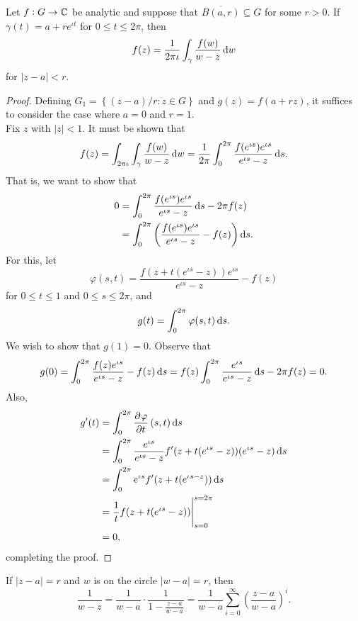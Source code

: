 	\begin{prop}
		Let $f : G \to \mathbb{C}$ be analytic and suppose that $\overline{B(a,r)} \subseteq G$ for some $r > 0$. If $\gamma(t) = a + re^{\iota t}$ for $ 0 \le t \le 2\pi$, then
		\[ f(z) = \frac{1}{2\pi\iota} \int_\gamma \frac{f(w)}{w - z} \dif w \]
		for $|z-a| < r$.
	\end{prop}
	\begin{proof}
		Defining $G_1 = \left\{ (z-a)/r : z \in G \right\}$ and $g(z) = f(a + r z)$, it suffices to consider the case where $a = 0$ and $r = 1$.\\
		Fix $z$ with $|z| < 1$. It must be shown that
		\[ f(z) = \int_{2\pi\iota} \int_\gamma \frac{f(w)}{w-z} \dif w = \frac{1}{2\pi} \int_0^{2\pi} \frac{f(e^{\iota s}) e^{\iota s}}{e^{\iota s} - z} \dif s. \]
		That is, we want to show that
		\begin{align*}
			 0 &= \int_0^{2\pi} \frac{f(e^{\iota s}) e^{\iota s}}{e^{\iota s} - z} \dif s - 2 \pi f(z) \\
			 	&= \int_0^{2\pi} \left(\frac{f(e^{\iota s}) e^{\iota s}}{e^{\iota s} - z} - f(z)\right) \dif s.
		\end{align*}
		For this, let
		\[ \varphi(s,t) = \frac{f(z + t(e^{\iota s} - z)) e^{\iota s}}{e^{\iota s} - z} - f(z) \]
		for $0 \le t \le 1$ and $0 \le s \le 2\pi$, and
		\[ g(t) = \int_0^{2\pi} \varphi(s,t) \dif s. \]
		We wish to show that $g(1) = 0$. Observe that
		\[ g(0) = \int_0^{2\pi} \frac{f(z) e^{\iota s}}{e^{\iota s} - z} - f(z) \dif s = f(z) \int_0^{2\pi} \frac{e^{\iota s}}{e^{\iota s} - z} \dif s - 2\pi f(z) = 0. \]
		Also,
		\begin{align*}
			g'(t) &= \int_0^{2\pi} \dpd{\varphi}{t}(s,t) \dif s \\
				&= \int_0^{2\pi} \frac{e^{\iota s}}{e^{\iota s} - z} f'(z + t(e^{\iota s} - z)) (e^{\iota s} - z) \dif s \\
				&= \int_0^{2\pi} e^{\iota s} f'(z + t(e^{\iota s - z})) \dif s \\
				&= \frac{1}{t} f(z + t(e^{\iota s} - z)) \Biggr|_{s=0}^{s=2\pi} \\
				&= 0,
		\end{align*}
		completing the proof.
	\end{proof}

	If $|z-a| = r$ and $w$ is on the circle $|w-a| = r$, then
	\[ \frac{1}{w-z} = \frac{1}{w-a} \cdot \frac{1}{1 - \frac{z-a}{w-a}} = \frac{1}{w-a} \sum_{i=0}^{\infty} \left( \frac{z-a}{w-a} \right)^i. \]
